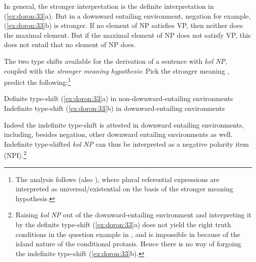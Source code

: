 \documentclass[output=paper]{langsci/langscibook}
\begin{document}
In general, the stronger interpretation is the definite interpretation in (\ref{ex:doron:33}a). But in a downward entailing environment, negation for example, (\ref{ex:doron:33}b) is stronger. If no element of NP satisfies VP, then neither does the maximal element. But if the maximal element of NP does not satisfy VP, this does not entail that no element of NP does.

The two type shifts available for the derivation of a sentence with \textit{kol} \textit{NP}, coupled with the \textit{stronger meaning hypothesis}: Pick the stronger meaning \citep{DalrympleEtAl1994}, predict the following:\footnote{The analysis follows \citet{Krifka1996} (also \citealt{Malamud:2012,Spector2018}), where plural referential expressions are interpreted as universal\slash existential on the basis of the stronger meaning hypothesis.}

\ea%
    \label{ex:doron:34}
\ea Definite type-shift  (\ref{ex:doron:33}a) in non-downward-entailing environments
\ex Indefinite type-shift  (\ref{ex:doron:33}b) in downward-entailing environments
\z
\z


Indeed the indefinite type-shift is attested in downward entailing environments, including, besides negation, other downward entailing environments as well. Indefinite type-shifted \textit{kol} \textit{NP} can thus be interpreted as a negative polarity item (NPI).\footnote{Raising \textit{kol} \textit{NP} out of the downward-entailing environment and interpreting it by the definite type-shift (\ref{ex:doron:33}a) does not yield the right truth conditions in the question example in , and is impossible in  because of the island nature of the conditional protasis. Hence there is no way of forgoing the indefinite type-shift (\ref{ex:doron:33}b).}
\end{document}

